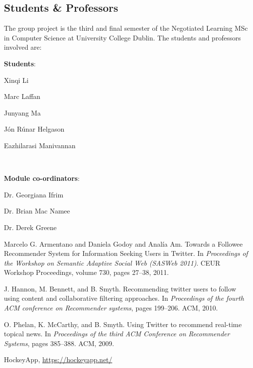 \documentclass{article}
\begin{document}
\subsection*{Students \& Professors}
The group project is the third and final semester of the Negotiated Learning MSc in Computer Science at University College Dublin. The students and professors involved are:
        
\begin{samepage}
\begin{center}
\begin{minipage}[t]{.4\textwidth}
	\textbf{Students}:
		\begin{itemize*}
			\item Xinqi Li
			\item Marc Laffan
			\item Junyang Ma
			\item Jón Rúnar Helgason
			\item Eazhilarasi Manivannan
		\end{itemize*}
\end{minipage}
~
\begin{minipage}[t]{.4\textwidth}
	\textbf{Module co-ordinators}:
	\begin{itemize*}
		\item Dr. Georgiana Ifrim
		\item Dr. Brian Mac Namee
		\item Dr. Derek Greene
	\end{itemize*}
\end{minipage}
\end{center}
\end{samepage}

\vspace{2em}


\begin{thebibliography}{9} 

    Marcelo G. Armentano and Daniela Godoy and Analía Am. Towards a Followee Recommender System for Information Seeking Users in Twitter.  In \textit{Proceedings of the Workshop on Semantic Adaptive Social Web (SASWeb 2011)}. CEUR Workshop Proceedings, volume 730, pages 27–38, 2011.
    
    J. Hannon, M. Bennett, and B. Smyth. Recommending twitter users to follow using content and collaborative filtering approaches. In \textit{Proceedings of the fourth ACM conference on Recommender systems}, pages 199–206. ACM, 2010.
    
    O. Phelan, K. McCarthy, and B. Smyth. Using Twitter to recommend real-time topical news. In \textit{Proceedings of the third ACM Conference on Recommender Systems}, pages 385–388. ACM, 2009.
    
    HockeyApp, \url{https://hockeyapp.net/}
	
\end{thebibliography}


\newpage
\end{document}
